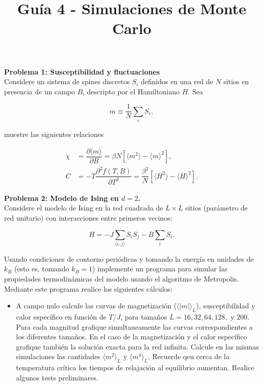 \documentclass[10pt]{article}
\begin{document}
\title{Guía 4 - Simulaciones de Monte Carlo}

\maketitle

\textbf{Problema 1: Susceptibilidad y fluctuaciones}
\\

Considere un sistema de spines discretos $S_i$ definidos en una red de $N$ sitios en presencia de un campo $B$, descripto por el Hamiltoniano $H$. Sea

\begin{equation}
m \equiv \dfrac{1}{N} \sum_i S_i,
\end{equation}

muestre las siguientes relaciones

\begin{align}
\chi &= \dfrac{\partial \langle m \rangle}{\partial B} = \beta N \left[ \langle m^2 \rangle - \langle m \rangle^2 \right],\\
C &= -T \dfrac{\partial^2 f(T,B)}{\partial T^2} = \dfrac{\beta^2}{N} \left[ \langle H^2 \rangle - \langle H \rangle^2 \right].
\end{align}


\textbf{Problema 2: Modelo de Ising en $d = 2$.}
\\

Considere el modelo de Ising en la red cuadrada de $L \times L$ sitios (parámetro de red unitario) con interacciones entre primeros vecinos:

\begin{equation}
H = - J \sum_{\langle i,j\rangle} S_i S_j - B \sum_i S_i.
\end{equation}

Usando condiciones de contorno periódicas y tomando la energía en unidades de $k_B$ (esto es, tomando $k_B = 1$) implemente un programa para simular las propiedades termodinámicas del modelo usando el algoritmo de Metropolis. Mediante este programa realice los siguientes cálculos:

\begin{itemize}

\item A campo nulo calcule las curvas de magnetización ($\langle |m| \rangle_L$), susceptibilidad y calor específico en función de $T/J$, para tamaños $L = 16, 32, 64, 128, \text{ y } 200$. Para cada magnitud grafique simultaneamente las curvas correspondientes a los diferentes tamaños. En el caso de la magnetización y el calor específico grafique también la solución exacta para la red infinita. Calcule en las mismas simulaciones las cantidades $\langle m^2 \rangle_L$ y $\langle m^4 \rangle_L$. Recuerde qeu cerca de la temperatura crítica los tiempos de relajación al equilibrio aumentan. Realice algunos tests preliminares.



\end{itemize}
\end{document}
